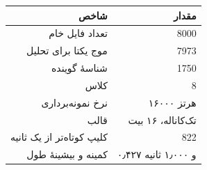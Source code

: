 \begin{center}
\begin{tabular}{rr}
\toprule
شاخص & مقدار \\
\midrule
تعداد فایل خام & 8000 \\
موج یکتا برای تحلیل & 7973 \\
شناسهٔ گوینده & 1750 \\
کلاس & 8 \\
نرخ نمونه‌برداری & ۱۶۰۰۰ هرتز \\
قالب & تک‌کاناله، ۱۶ بیت \\
کلیپ کوتاه‌تر از یک ثانیه & 822 \\
کمینه و بیشینهٔ طول & ۰٫۴۲۷ و ۱٫۰۰۰ ثانیه \\
\bottomrule
\end{tabular}
\end{center}
